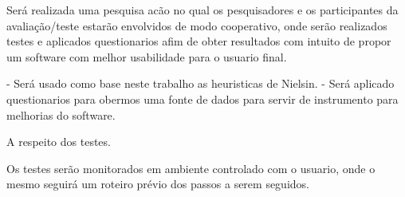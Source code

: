 
	Será realizada uma pesquisa acão no qual os pesquisadores e os participantes da avaliação/teste estarão envolvidos de modo cooperativo, onde serão realizados testes e aplicados questionarios afim de obter resultados com intuito de propor um software com melhor usabilidade para o usuario final.

	- Será usado como base neste trabalho as heuristicas de Nielsin. 
	- Será aplicado questionarios para obermos uma fonte de dados para servir de instrumento para melhorias do software.

	A respeito dos testes.

	Os testes serão monitorados em ambiente controlado com o usuario, onde o mesmo seguirá um roteiro prévio dos passos a serem seguidos.
